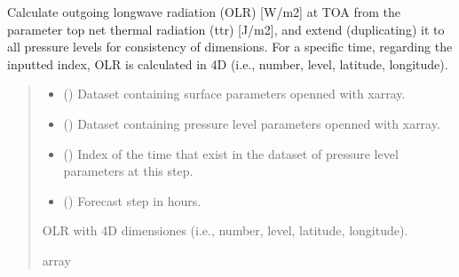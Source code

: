 \documentclass[a4paper,11pt,english]{sphinxmanual}
\begin{document}

\begin{fulllineitems}
\label{\detokenize{modules:envlib.processing_surf_vars.extend_olr_pl_5d}}
\pysigstartsignatures
{}
\pysigstopsignatures
\sphinxAtStartPar
Calculate outgoing longwave radiation (OLR) {[}W/m2{]} at TOA from the parameter top net thermal radiation (ttr)
{[}J/m2{]}, and extend (duplicating) it to all pressure levels for consistency of dimensions. For a specific time, 
regarding the inputted index, OLR is calculated in 4D (i.e., number, level, latitude, longitude).
\begin{quote}\begin{description}
\begin{itemize}
\item {} 
\sphinxAtStartPar
{} () \textendash{} Dataset containing surface parameters openned with xarray.

\item {} 
\sphinxAtStartPar
{} () \textendash{} Dataset containing pressure level parameters openned with xarray.

\item {} 
\sphinxAtStartPar
{} () \textendash{} Index of the time that exist in the dataset of pressure level parameters at this step.

\item {} 
\sphinxAtStartPar
{} () \textendash{} Forecast step in hours.

\end{itemize}

\sphinxAtStartPar
OLR with 4D dimensiones (i.e., number, level, latitude, longitude).

\sphinxAtStartPar
array

\end{description}\end{quote}

\end{fulllineitems}
\end{document}
